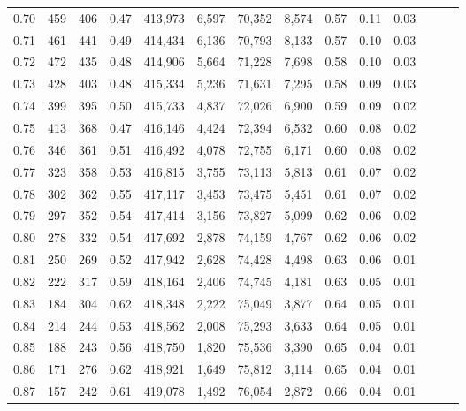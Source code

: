 \begin{tabular}{rrrrrrrrrrrrrr}
0.70 &     459 &    406 &  0.47 &  413,973 &    6,597 &  70,352 &   8,574 &  0.57 &  0.11 &      0.03 \\
0.71 &     461 &    441 &  0.49 &  414,434 &    6,136 &  70,793 &   8,133 &  0.57 &  0.10 &      0.03 \\
0.72 &     472 &    435 &  0.48 &  414,906 &    5,664 &  71,228 &   7,698 &  0.58 &  0.10 &      0.03 \\
0.73 &     428 &    403 &  0.48 &  415,334 &    5,236 &  71,631 &   7,295 &  0.58 &  0.09 &      0.03 \\
0.74 &     399 &    395 &  0.50 &  415,733 &    4,837 &  72,026 &   6,900 &  0.59 &  0.09 &      0.02 \\
0.75 &     413 &    368 &  0.47 &  416,146 &    4,424 &  72,394 &   6,532 &  0.60 &  0.08 &      0.02 \\
0.76 &     346 &    361 &  0.51 &  416,492 &    4,078 &  72,755 &   6,171 &  0.60 &  0.08 &      0.02 \\
0.77 &     323 &    358 &  0.53 &  416,815 &    3,755 &  73,113 &   5,813 &  0.61 &  0.07 &      0.02 \\
0.78 &     302 &    362 &  0.55 &  417,117 &    3,453 &  73,475 &   5,451 &  0.61 &  0.07 &      0.02 \\
0.79 &     297 &    352 &  0.54 &  417,414 &    3,156 &  73,827 &   5,099 &  0.62 &  0.06 &      0.02 \\
0.80 &     278 &    332 &  0.54 &  417,692 &    2,878 &  74,159 &   4,767 &  0.62 &  0.06 &      0.02 \\
0.81 &     250 &    269 &  0.52 &  417,942 &    2,628 &  74,428 &   4,498 &  0.63 &  0.06 &      0.01 \\
0.82 &     222 &    317 &  0.59 &  418,164 &    2,406 &  74,745 &   4,181 &  0.63 &  0.05 &      0.01 \\
0.83 &     184 &    304 &  0.62 &  418,348 &    2,222 &  75,049 &   3,877 &  0.64 &  0.05 &      0.01 \\
0.84 &     214 &    244 &  0.53 &  418,562 &    2,008 &  75,293 &   3,633 &  0.64 &  0.05 &      0.01 \\
0.85 &     188 &    243 &  0.56 &  418,750 &    1,820 &  75,536 &   3,390 &  0.65 &  0.04 &      0.01 \\
0.86 &     171 &    276 &  0.62 &  418,921 &    1,649 &  75,812 &   3,114 &  0.65 &  0.04 &      0.01 \\
0.87 &     157 &    242 &  0.61 &  419,078 &    1,492 &  76,054 &   2,872 &  0.66 &  0.04 &      0.01 \\

\end{tabular}
